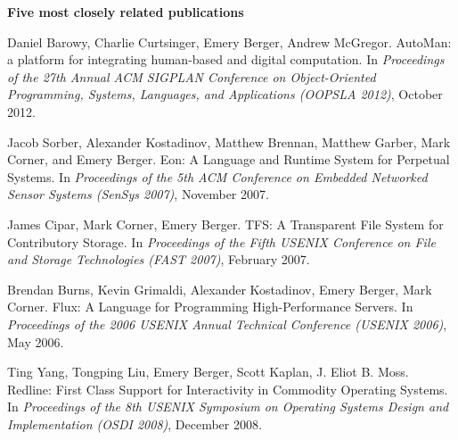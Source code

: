 \documentclass[11pt]{article}
\begin{document}
\begin{description}
\setlength{\labelsep}{0ex}
\setlength{\itemsep}{-0.5ex}

\item {\bf\textsf {Five most closely related publications}}


\item Daniel Barowy, Charlie Curtsinger, Emery Berger, Andrew McGregor. AutoMan: a platform for integrating human-based and digital computation. In {\em Proceedings of the 27th Annual ACM SIGPLAN Conference on Object-Oriented Programming, Systems, Languages, and Applications ({OOPSLA} 2012)}, October 2012.

\item Jacob Sorber, Alexander Kostadinov, Matthew Brennan, Matthew Garber, Mark Corner, and Emery Berger. Eon: A Language and Runtime System for Perpetual Systems. In {\em Proceedings of the 5th {ACM} Conference on Embedded Networked Sensor Systems ({SenSys} 2007)}, November 2007.

\item James Cipar, Mark Corner, Emery Berger. TFS: A Transparent File System for Contributory Storage. In {\em Proceedings of the Fifth {USENIX} Conference on File and Storage Technologies ({FAST} 2007)}, February 2007.

\item Brendan Burns, Kevin Grimaldi, Alexander Kostadinov, Emery Berger, Mark Corner. Flux: A Language for Programming High-Performance Servers. In {\em Proceedings of the 2006 {USENIX} Annual Technical Conference ({USENIX} 2006)}, May 2006.

\item Ting Yang, Tongping Liu, Emery Berger, Scott Kaplan, J. Eliot B. Moss. Redline: First Class Support for Interactivity in Commodity Operating Systems. In {\em Proceedings of the 8th USENIX Symposium on Operating Systems Design and Implementation ({OSDI} 2008)}, December 2008.

\end{description}
\end{document}
